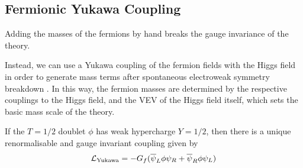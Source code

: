 \subsection{Fermionic Yukawa Coupling}\label{sec:higgs_yukawa_coupling}
Adding the masses of the fermions by hand breaks the gauge invariance of the theory.

Instead, we can use a Yukawa coupling of the fermion fields with the Higgs field in order to generate mass terms after spontaneous electroweak symmetry breakdown \cite{Weinberg:1967tq}.
In this way, the fermion masses are determined by the respective couplings to the Higgs field, and the VEV of the Higgs field itself, which sets the basic mass scale of the theory.

If the $T = 1/2$ doublet $\phi$ has weak hypercharge $Y = 1/2$, then there is a unique renormalisable and gauge invariant coupling given by
%
\begin{equation}\label{eq:yukawa_coupling}
  \mathcal{L}_{\textnormal{Yukawa}} = 
  - G_f (\overline{\psi}_L \phi \psi_R + \overline{\psi}_R \phi \psi_L)
\end{equation}
%


